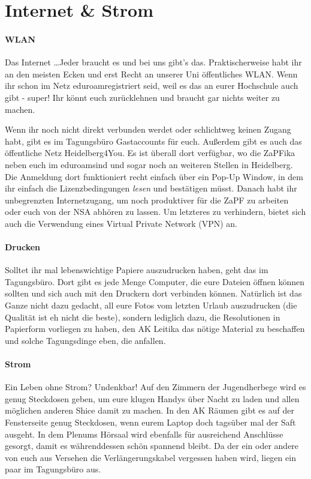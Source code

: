 
\section{Internet \& Strom}
\paragraph{WLAN}
Das Internet \dots Jeder braucht es und bei uns gibt's das. Praktischerweise habt ihr an den meisten Ecken und erst Recht an unserer Uni öffentliches WLAN. Wenn ihr schon im Netz \glqq eduroam\grqq registriert seid, weil es das an eurer Hochschule auch gibt - super! Ihr könnt euch zurücklehnen und braucht gar nichts weiter zu machen.

Wenn ihr noch nicht direkt verbunden werdet oder schlichtweg keinen Zugang habt, gibt es im Tagungsbüro Gastaccounts für euch. Außerdem gibt es auch das öffentliche Netz \glqq Heidelberg4You\grqq. Es ist überall dort verfügbar, wo die ZaPFika neben euch im \glqq eduroam\grqq sind und sogar noch an weiteren Stellen in Heidelberg. Die Anmeldung dort funktioniert recht einfach über ein Pop-Up Window, in dem ihr einfach die Lizenzbedingungen \textit{lesen} und bestätigen müsst. Danach habt ihr unbegrenzten Internetzugang, um noch produktiver für die ZaPF zu arbeiten oder euch von der NSA abhören zu lassen. Um letzteres zu verhindern, bietet sich auch die Verwendung eines Virtual Private Network (VPN) an.

\paragraph{Drucken}
Solltet ihr mal lebenswichtige Papiere auszudrucken haben, geht das im Tagungsbüro. Dort gibt es jede Menge Computer, die eure Dateien öffnen können sollten und sich auch mit den Druckern dort verbinden können. Natürlich ist das Ganze nicht dazu gedacht, all eure Fotos vom letzten Urlaub auszudrucken (die Qualität ist eh nicht die beste), sondern lediglich dazu, die Resolutionen in Papierform vorliegen zu haben, den AK Leitika das nötige Material zu beschaffen und solche Tagungsdinge eben, die anfallen.

\paragraph{Strom}
Ein Leben ohne Strom? Undenkbar! Auf den Zimmern der Jugendherbege wird es genug Steckdosen geben, um eure klugen Handys über Nacht zu laden und allen möglichen anderen Shice damit zu machen. In den AK Räumen gibt es auf der Fensterseite genug Steckdosen, wenn eurem Laptop doch tagsüber mal der Saft ausgeht. In dem Plenums Hörsaal wird ebenfalls für ausreichend Anschlüsse gesorgt, damit es währenddessen schön spannend bleibt. Da der ein oder andere von euch aus Versehen die Verlängerungskabel vergessen haben wird, liegen ein paar im Tagungsbüro aus.